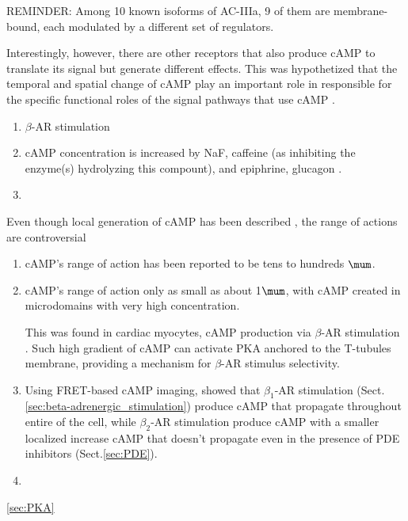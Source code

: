 REMINDER: Among 10 known isoforms of AC-IIIa, 9 of them are membrane-bound,
each modulated by a different set of regulators.


Interestingly, however, there are other receptors that also produce cAMP to
translate its signal but generate different effects. This was hypothetized that
the temporal and spatial change of cAMP play an important role in responsible
for the specific functional roles of the signal pathways that use cAMP
\citep{Zaccolo2002}. 

\begin{enumerate}
  \item $\beta$-AR stimulation
  
  \item cAMP concentration is increased by NaF, caffeine (as inhibiting the enzyme(s)
hydrolyzing this compount), and epiphrine, glucagon \citep{Rall1958}.

  \item 
\end{enumerate}

Even though local generation of cAMP has been described
\citep{brunton1981, Buxton1983}, the range of actions are controversial
\begin{enumerate}
  
  \item  cAMP's range of action has been reported to be tens to hundreds $\mum$. 
  
  
  \item cAMP's range of action only as small as about 1$\mum$, with cAMP
  created in microdomains with very high concentration.
  
This was found in cardiac myocytes, cAMP production via $\beta$-AR stimulation
\citep{Zaccolo2002}. Such high gradient of cAMP can activate PKA anchored to the T-tubules membrane,
providing a mechanism for $\beta$-AR stimulus selectivity. 

  \item Using FRET-based cAMP imaging, \citep{Nikolaev2006} showed that
  $\beta_1$-AR stimulation (Sect.\ref{sec:beta-adrenergic_stimulation}) produce
  cAMP that propagate throughout entire of the cell, while $\beta_2$-AR
  stimulation produce cAMP with a smaller localized increase cAMP that doesn't
  propagate even in the presence of PDE inhibitors \citep{lisa2006}
  (Sect.\ref{sec:PDE}).

  \item 
\end{enumerate}
\ref{sec:PKA}

